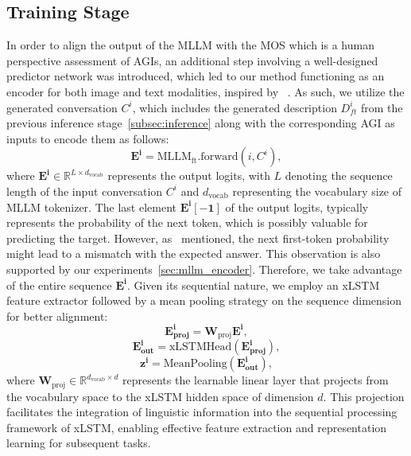 \subsection{Training Stage}
In order to align the output of the MLLM with the MOS which is a human perspective assessment of AGIs, an additional step involving a well-designed predictor network was introduced, which led to our method functioning as an encoder for both image and text modalities, inspired by ~\cite{behnamghader2024llm2vec}.
As such, we utilize the generated conversation $C^i$, which includes the generated description $D^i_{ft}$ from the previous inference stage~\ref{subsec:inference} along with the corresponding AGI as inputs to encode them as follows:
\begin{equation}
    \boldsymbol{E^i} = \textrm{MLLM}_\textrm{ft}.\textrm{forward}\left(i, C^i\right),
\end{equation}
where $\boldsymbol{E^i} \in \mathbb{R}^{L \times d_\textrm{vocab}} $ represents the output logits, with $L$ denoting the sequence length of the input conversation $C^i$ and $d_\textrm{vocab}$ representing the vocabulary size of MLLM tokenizer.
The last element $\boldsymbol{E^i[-1]}$ of the output logits, typically represents the probability of the next token, which is possibly valuable for predicting the target.
However, as~\cite{wang2024my} mentioned, the next first-token probability might lead to a mismatch with the expected answer. This observation is also supported by our experiments~\ref{sec:mllm_encoder}. %
Therefore, we take advantage of the entire sequence $\boldsymbol{E^i}$.
Given its sequential nature, we employ an xLSTM feature extractor followed by a mean pooling strategy on the sequence dimension for better alignment:
\begin{equation}
    \boldsymbol{E^i_\textrm{proj}} = \mathbf{W}_\textrm{proj} \boldsymbol{E^i},
\end{equation}
\begin{equation}
    \boldsymbol{E^i_\textrm{out}} = \textrm{xLSTMHead}\left(\boldsymbol{E^i_\textrm{proj}}\right),
\end{equation}
\begin{equation}
    \boldsymbol{z^i} = \textrm{MeanPooling}\left(\boldsymbol{E^i_\textrm{out}}\right),
\end{equation}
where $\mathbf{W}_\textrm{proj} \in \mathbb{R}^{d_{\textrm{vocab}} \times d}$ represents the learnable linear layer that projects from the vocabulary space to the xLSTM hidden space of dimension $d$. 
This projection facilitates the integration of linguistic information into the sequential processing framework of xLSTM, enabling effective feature extraction and representation learning for subsequent tasks.

